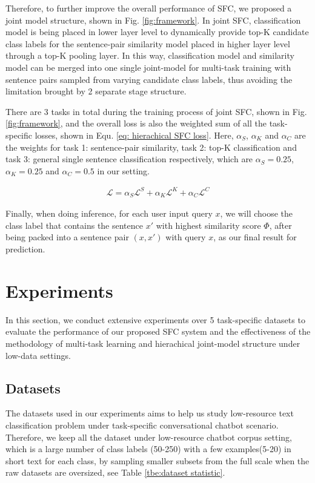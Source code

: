 \documentclass[letterpaper]{article} %
\begin{document}
  Therefore,  to  further  improve the overall performance of SFC, we proposed a
  joint  model  structure,  shown  in Fig. \ref{fig:framework}. In
  joint SFC, classification model is being placed in lower layer level to
  dynamically  provide  top-K  candidate  class  labels  for  the  sentence-pair
  similarity  model  placed in higher layer level through a top-K pooling layer.
  In  this way, classification model and similarity model can be merged into one
  single  joint-model  for  multi-task training with sentence pairs sampled from
  varying  candidate  class  labels,  thus  avoiding the limitation brought by 2
  separate stage structure.

  There  are  3  tasks in total during the training process of joint SFC,
  shown  in  Fig. \ref{fig:framework}, and the overall loss is also the weighted
  sum  of  all  the task-specific losses, shown in Equ. \ref{eq: hierachical SFC
  loss}. Here, $\alpha_S$, $\alpha_K$ and $\alpha_C$ are the weights for task 1:
  sentence-pair  similarity,  task  2:  top-K classification and task 3: general
  single   sentence  classification  respectively,  which  are  $\alpha_S=0.25$,
  $\alpha_K=0.25$ and $\alpha_C=0.5$ in our setting.

  \begin{align}
    \mathcal{L} = \alpha_S \mathcal{L}^S + \alpha_K \mathcal{L}^K + \alpha_C \mathcal{L}^C
    \label{eq: hierachical SFC loss}
  \end{align}

  Finally,  when  doing inference, for each user input query $x$, we will choose
  the  class label that contains the sentence $x'$ with highest similarity score
  $\varPhi$,  after  being packed into a sentence pair $(x, x')$ with query $x$,
  as our final result for prediction.

  \section{Experiments}
  In  this  section,  we  conduct  extensive  experiments  over  5 task-specific
  datasets  to  evaluate  the  performance  of  our  proposed SFC system and the
  effectiveness  of  the  methodology  of  multi-task  learning  and hierachical
  joint-model structure under low-data settings.

  \subsection{Datasets}
  The  datasets  used in our experiments aims to help us study low-resource text
  classification  problem  under  task-specific conversational chatbot scenario.
  Therefore,  we keep all the dataset under low-resource chatbot corpus setting,
  which  is a large number of class labels (50-250) with a few examples(5-20) in
  short  text  for  each  class, by sampling smaller subsets from the full scale
  when the raw datasets are oversized, see Table \ref{tbe:dataset statistic}.
\end{document}
